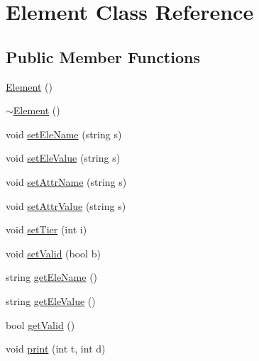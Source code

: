 \hypertarget{class_element}{\section{Element Class Reference}
\label{class_element}
}
\subsection*{Public Member Functions}
\begin{DoxyCompactItemize}
\item 
\hyperlink{class_element_ab0d0e20be9a36ae676202db753faeec9}{Element} ()
\item 
\hyperlink{class_element_a13d54ba9c08b6bec651402f1c2bb002c}{$\sim$\-Element} ()
\item 
void \hyperlink{class_element_a44b5552308fe679566a2808bed16939c}{set\-Ele\-Name} (string s)
\item 
void \hyperlink{class_element_a6f656e91ad5681bb60af85697a56e76d}{set\-Ele\-Value} (string s)
\item 
void \hyperlink{class_element_a94825e96a41b8963b7669eb65c909476}{set\-Attr\-Name} (string s)
\item 
void \hyperlink{class_element_a08798ba236c4e97ff28530302fa30ae7}{set\-Attr\-Value} (string s)
\item 
void \hyperlink{class_element_a8faeae35481b53b67fad8bef0caec094}{set\-Tier} (int i)
\item 
void \hyperlink{class_element_a568df8f466f6bb5e6d690a2d2036aaf5}{set\-Valid} (bool b)
\item 
string \hyperlink{class_element_aaabf9f1dca9b320738dead3e3843ece3}{get\-Ele\-Name} ()
\item 
string \hyperlink{class_element_a31fccf5792707b9c061cb94171d09d83}{get\-Ele\-Value} ()
\item 
bool \hyperlink{class_element_a64fb4bd661430a3ccd7e17f457d75adb}{get\-Valid} ()
\item 
void \hyperlink{class_element_a20b6851abb8a8bb0283ec2b0b677c5de}{print} (int t, int d)
\end{DoxyCompactItemize}


